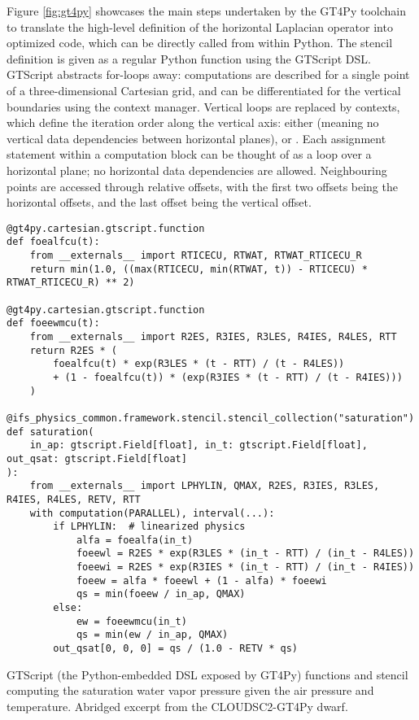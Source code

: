 \documentclass[../main.tex]{subfiles}
\begin{document}
        Figure \ref{fig:gt4py} showcases the main steps undertaken by the GT4Py toolchain to translate the high-level definition of the horizontal Laplacian operator into optimized code, which can be directly called from within Python. The stencil definition is given as a regular Python function using the GTScript DSL. GTScript abstracts for-loops away: computations are described for a single point of a three-dimensional Cartesian grid, and can be differentiated for the vertical boundaries using the  context manager. Vertical loops are replaced by  contexts, which define the iteration order along the vertical axis: either  (meaning no vertical data dependencies between horizontal planes),  or . Each assignment statement within a computation block can be thought of as a loop over a horizontal plane; no horizontal data dependencies are allowed. Neighbouring points are accessed through relative offsets, with the first two offsets being the horizontal offsets, and the last offset being the vertical offset.

        \begin{listing}[t!]
            \begin{verbatim}
@gt4py.cartesian.gtscript.function
def foealfcu(t):
    from __externals__ import RTICECU, RTWAT, RTWAT_RTICECU_R
    return min(1.0, ((max(RTICECU, min(RTWAT, t)) - RTICECU) * RTWAT_RTICECU_R) ** 2)

@gt4py.cartesian.gtscript.function
def foeewmcu(t):
    from __externals__ import R2ES, R3IES, R3LES, R4IES, R4LES, RTT
    return R2ES * (
        foealfcu(t) * exp(R3LES * (t - RTT) / (t - R4LES))
        + (1 - foealfcu(t)) * (exp(R3IES * (t - RTT) / (t - R4IES)))
    )

@ifs_physics_common.framework.stencil.stencil_collection("saturation")
def saturation(
    in_ap: gtscript.Field[float], in_t: gtscript.Field[float], out_qsat: gtscript.Field[float]
):
    from __externals__ import LPHYLIN, QMAX, R2ES, R3IES, R3LES, R4IES, R4LES, RETV, RTT
    with computation(PARALLEL), interval(...):
        if LPHYLIN:  # linearized physics
            alfa = foealfa(in_t)
            foeewl = R2ES * exp(R3LES * (in_t - RTT) / (in_t - R4LES))
            foeewi = R2ES * exp(R3IES * (in_t - RTT) / (in_t - R4IES))
            foeew = alfa * foeewl + (1 - alfa) * foeewi
            qs = min(foeew / in_ap, QMAX)
        else:
            ew = foeewmcu(in_t)
            qs = min(ew / in_ap, QMAX)
        out_qsat[0, 0, 0] = qs / (1.0 - RETV * qs)
            \end{verbatim}

            \caption{GTScript (the Python-embedded DSL exposed by GT4Py) functions and stencil computing the saturation water vapor pressure given the air pressure and temperature. Abridged excerpt from the CLOUDSC2-GT4Py dwarf.}
            \label{lst:saturation-stencil}
        \end{listing}
\end{document}
